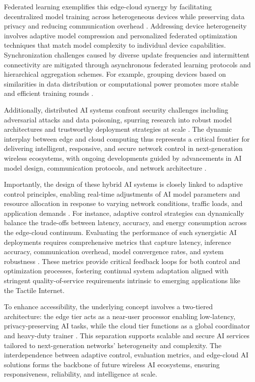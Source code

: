\documentclass[sigconf]{acmart}
\begin{document}
Federated learning exemplifies this edge-cloud synergy by facilitating decentralized model training across heterogeneous devices while preserving data privacy and reducing communication overhead \cite{ref10}. Addressing device heterogeneity involves adaptive model compression and personalized federated optimization techniques that match model complexity to individual device capabilities. Synchronization challenges caused by diverse update frequencies and intermittent connectivity are mitigated through asynchronous federated learning protocols and hierarchical aggregation schemes. For example, grouping devices based on similarities in data distribution or computational power promotes more stable and efficient training rounds \cite{ref9,ref10}.

Additionally, distributed AI systems confront security challenges including adversarial attacks and data poisoning, spurring research into robust model architectures and trustworthy deployment strategies at scale \cite{ref49,ref50}. The dynamic interplay between edge and cloud computing thus represents a critical frontier for delivering intelligent, responsive, and secure network control in next-generation wireless ecosystems, with ongoing developments guided by advancements in AI model design, communication protocols, and network architecture \cite{ref10,ref13,ref49,ref50}.

Importantly, the design of these hybrid AI systems is closely linked to adaptive control principles, enabling real-time adjustments of AI model parameters and resource allocation in response to varying network conditions, traffic loads, and application demands \cite{ref10,ref50}. For instance, adaptive control strategies can dynamically balance the trade-offs between latency, accuracy, and energy consumption across the edge-cloud continuum. Evaluating the performance of such synergistic AI deployments requires comprehensive metrics that capture latency, inference accuracy, communication overhead, model convergence rates, and system robustness \cite{ref10,ref13,ref50}. These metrics provide critical feedback loops for both control and optimization processes, fostering continual system adaptation aligned with stringent quality-of-service requirements intrinsic to emerging applications like the Tactile Internet.

To enhance accessibility, the underlying concept involves a two-tiered architecture: the edge tier acts as a near-user processor enabling low-latency, privacy-preserving AI tasks, while the cloud tier functions as a global coordinator and heavy-duty trainer \cite{ref9,ref10}. This separation supports scalable and secure AI services tailored to next-generation networks' heterogeneity and complexity. The interdependence between adaptive control, evaluation metrics, and edge-cloud AI solutions forms the backbone of future wireless AI ecosystems, ensuring responsiveness, reliability, and intelligence at scale.
\end{document}
